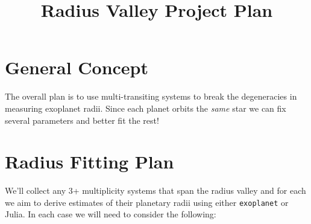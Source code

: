 \documentclass[12pt, letterpaper, twoside]{article}
\title{Radius Valley Project Plan}
\date{}
\begin{document}
\maketitle{}

\vspace{-2.5cm}

\section*{General Concept}
The overall plan is to use multi-transiting systems to break the degeneracies in measuring exoplanet radii. Since each planet orbits the \textit{same} star we can fix several parameters and better fit the rest!

\section*{Radius Fitting Plan}
We'll collect any 3+ multiplicity systems that span the radius valley and for each we aim to derive estimates of their planetary radii using either \texttt{exoplanet} or Julia. In each case we will need to consider the following:
\end{document}
